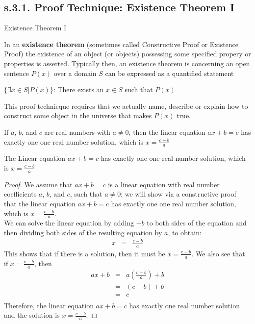 \newpage
\subsection{s.3.1. Proof Technique: Existence Theorem I}

\begin{definition} 
Existence Theorem I

In an {\bf existence theorem} (sometimes called Constructive Proof or Existence Proof) the existence of an object (or objects) possessing some specified propery or properties is asserted. Typically then, an existence theorem is concerning an open sentence $P(x)$ over a domain $S$ can be expressed as a quantified statement
	\begin{center}
		$\{ \exists x \in S | P(x) \}$: There exists an $x \in S$ such that $P(x)$
	\end{center}
This proof technieque requires that we actually name, describe or explain how to construct some object in the universe that makes $P(x)$ true.
\end{definition}

\begin{example}
If $a$, $b$, and $c$ are real numbers with $a \neq 0$, then the linear equation $ax + b = c$ has exactly one one real number solution, which is $x = \frac{c-b}{a}$ \\

\begin{tcolorbox}
	\begin{theorem}
		The Linear equation $ax + b = c$ has exactly one one real number solution, which is $x = \frac{c-b}{a}$
	\end{theorem}
\end{tcolorbox}

\begin{proof}
We assume that $ax + b = c$ is a linear equation  with real number coefficients $a$, $b$, and $c$, such that $a \neq 0$; we will show via a constructive proof that the linear equation $ax + b = c$ has exactly one one real number solution, which is $x = \frac{c-b}{a}$. \\
We can solve the linear equation by adding $-b$ to both sides of the equation and then dividing both sides of the resulting equation by $a$, to obtain: 
	\begin{eqnarray*}
		x & = & \frac{c-b}{a}
	\end{eqnarray*}
This shows that if there is a solution, then it must be $x = \frac{c-b}{a}$. We also see that if $x = \frac{c-b}{a}$, then
	\begin{eqnarray*}
		ax + b & = & a(\frac{c-b}{a}) + b  \nonumber \\
		& = & (c-b) + b \nonumber \\
		& = & c \nonumber \\
	\end{eqnarray*}
Therefore, the linear equation $ax + b = c$ has exactly one real number solution and the solution is $x = \frac{c-b}{a}$. 
\end{proof}
\end{example}


